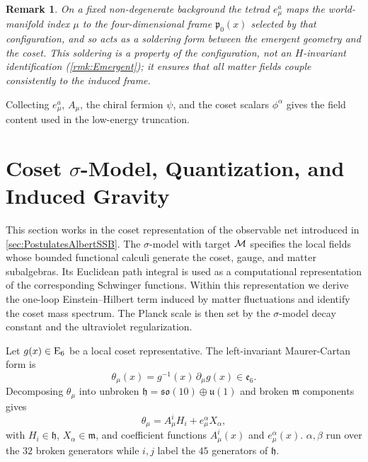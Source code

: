 \documentclass[pdflatex,sn-mathphys-num]{sn-jnl}
\theoremstyle{thmstyleone}
\theoremstyle{thmstylethree}%
\theoremstyle{thmstyletwo}%
\newtheorem{remark}[remark]{Remark}
\begin{document}
\medskip
\begin{remark}\label{rmk:Soldering}
On a fixed non-degenerate background the tetrad $e_{\mu}^{ a}$ maps the
world-manifold index $\mu$ to the four-dimensional frame $\mathfrak p_{0}(x)$
selected by that configuration, and so acts as a soldering form between
the emergent geometry and the coset. This soldering is a property of the
configuration, not an $H$-invariant identification (\autoref{rmk:Emergent}); it
ensures that all matter fields couple consistently to the induced frame.
\end{remark}

Collecting $e_{\mu}^{ a}$, $A_{\mu}$, the chiral fermion
$\psi$, and the coset scalars $\phi^{\alpha}$ gives the field content used
in the low-energy truncation.

\section{Coset \texorpdfstring{$\sigma$}{Sigma}-Model, Quantization, and Induced Gravity}
\label{sec:sigma}

This section works in the coset representation of the observable net introduced
in \autoref{sec:PostulatesAlbertSSB}. The $\sigma$-model with target \(\mathcal{M}\)
specifies the local fields whose bounded functional calculi generate the coset,
gauge, and matter subalgebras. Its Euclidean path integral is used as a
computational representation of the corresponding Schwinger functions. Within
this representation we derive the one-loop Einstein--Hilbert term induced by
matter fluctuations and identify the coset mass spectrum. The Planck scale is
then set by the $\sigma$-model decay constant and the ultraviolet
regularization.

Let $g(x)\in \mathrm{E}_{6}$ be a local coset representative.  
The left-invariant Maurer-Cartan form is
\begin{equation}\label{eq:MC}
  \theta_\mu(x) = g^{-1}(x)\,\partial_\mu g(x) \in \mathfrak e_{6}.
\end{equation}
Decomposing $\theta_\mu$ into unbroken $\mathfrak h = \mathfrak{so}(10) \oplus \mathfrak u(1)$ and broken $\mathfrak m$ components gives
\[
  \theta_\mu = A_\mu^{ i} H_i + e_\mu^{ \alpha} X_\alpha,
\]
with $H_i \in \mathfrak h$, $X_\alpha \in \mathfrak m$, and coefficient functions $A_\mu^{ i}(x)$ and $e_\mu^{ \alpha}(x)$. $\alpha,\beta$ run over the $32$ broken generators while $i,j$ label the $45$ generators of $\mathfrak h$.
\end{document}
